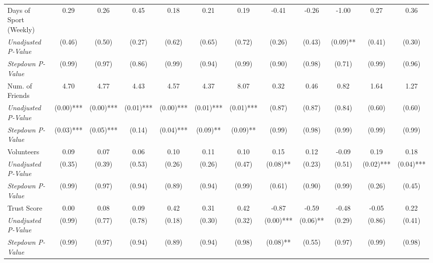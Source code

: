 \begin{tabular}{l c c c c c c c c c c c}
Days of Sport (Weekly) & 0.29 & 0.26 & 0.45 & 0.18 & 0.21 & 0.19 & -0.41 & -0.26 & -1.00 & 0.27 & 0.36 \\
\quad \textit{Unadjusted P-Value} & (0.46) & (0.50) & (0.27) & (0.62) & (0.65) & (0.72) & (0.26) & (0.43) & (0.09)** & (0.41) & (0.30) \\
\quad \textit{Stepdown P-Value} & (0.99) & (0.97) & (0.86) & (0.99) & (0.94) & (0.99) & (0.90) & (0.98) & (0.71) & (0.99) & (0.96) \\
Num. of Friends & 4.70 & 4.77 & 4.43 & 4.57 & 4.37 & 8.07 & 0.32 & 0.46 & 0.82 & 1.64 & 1.27 \\
\quad \textit{Unadjusted P-Value} & (0.00)*** & (0.00)*** & (0.01)*** & (0.00)*** & (0.01)*** & (0.01)*** & (0.87) & (0.87) & (0.84) & (0.60) & (0.60) \\
\quad \textit{Stepdown P-Value} & (0.03)*** & (0.05)*** & (0.14) & (0.04)*** & (0.09)** & (0.09)** & (0.99) & (0.98) & (0.99) & (0.99) & (0.99) \\
Volunteers & 0.09 & 0.07 & 0.06 & 0.10 & 0.11 & 0.10 & 0.15 & 0.12 & -0.09 & 0.19 & 0.18 \\
\quad \textit{Unadjusted P-Value} & (0.35) & (0.39) & (0.53) & (0.26) & (0.26) & (0.47) & (0.08)** & (0.23) & (0.51) & (0.02)*** & (0.04)*** \\
\quad \textit{Stepdown P-Value} & (0.99) & (0.97) & (0.94) & (0.89) & (0.94) & (0.99) & (0.61) & (0.90) & (0.99) & (0.26) & (0.45) \\
Trust Score & 0.00 & 0.08 & 0.09 & 0.42 & 0.31 & 0.42 & -0.87 & -0.59 & -0.48 & -0.05 & 0.22 \\
\quad \textit{Unadjusted P-Value} & (0.99) & (0.77) & (0.78) & (0.18) & (0.30) & (0.32) & (0.00)*** & (0.06)** & (0.29) & (0.86) & (0.41) \\
\quad \textit{Stepdown P-Value} & (0.99) & (0.97) & (0.94) & (0.89) & (0.94) & (0.98) & (0.08)** & (0.55) & (0.97) & (0.99) & (0.98) \\
\bottomrule
\end{tabular}
